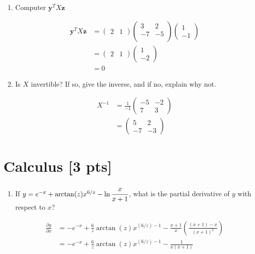 \documentclass[a4paper]{article}
\theoremstyle{definition}
\newenvironment{soln}{
	\leavevmode\color{blue}\ignorespaces
}{}
\begin{document}
	\begin{enumerate}
		\item 	Computer $\mathbf{y}^{T} X \mathbf{z}$\\
			    \begin{soln} 
					$$
					\begin{aligned}
						\mathbf{y}^{T} X \mathbf{z} & = \begin{pmatrix} 2 & 1 \end{pmatrix} \begin{pmatrix} 3 & 2 \\ -7 & -5 \\ \end{pmatrix} \begin{pmatrix} 1 \\ -1 \end{pmatrix} \\
						& = \begin{pmatrix} 2 & 1 \end{pmatrix} \begin{pmatrix} 1 \\ -2 \end{pmatrix} \\
						& = 0 
					\end{aligned}
					$$
				\end{soln}
		\item 	Is $X$ invertible? If so, give the inverse, and if no, explain why not.\\
		        \begin{soln}
					$$
					\begin{aligned}
						X^{-1} & = \frac{1}{-1} \begin{pmatrix} -5 & -2 \\ 7 & 3 \end{pmatrix} \\
						& = \begin{pmatrix} 5 & 2 \\ -7 & -3 \end{pmatrix} 
					\end{aligned}
					$$
				\end{soln}
	\end{enumerate}
	
	
	\section{Calculus [3 pts]}
	\begin{enumerate}
		\item If $y = e^{-x} + \arctan(z)x^{6/z} - \ln\cfrac{x}{x+1}$, what is the partial derivative of $y$ with respect to $x$?\\
		\begin{soln} 
			$$
			\begin{aligned}
				\frac{\partial y}{\partial x} & = -e^{-x} + \frac{6}{z} \arctan(z) x^{(6/z) - 1} - \frac{x+1}{x} \left(\frac{(x+1)-x}{(x+1)^{2}}\right) \\
				& = -e^{-x} + \frac{6}{z} \arctan(z) x^{(6/z) - 1} - \frac{1}{x(x+1)} 
			\end{aligned}
			$$
		\end{soln}
	\end{enumerate}
	
\end{document}
